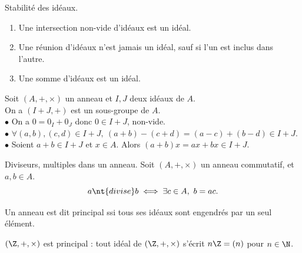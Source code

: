\documentclass[11pt]{article}
\begin{document}
\vspace*{-0.7cm}

\begin{prop}{Stabilité des idéaux.}{}
    \begin{enumerate}
        \item Une intersection non-vide d'idéaux est un idéal.
        \item Une réunion d'idéaux n'est jamais un idéal, sauf si l'un est inclus dans l'autre.
        \item Une somme d'idéaux est un idéal.
    \end{enumerate}
    \tcblower
    Soit $(A,+,\times)$ un anneau et $I,J$ deux idéaux de $A$.\\
     On a $(I+J,+)$ est un sous-groupe de $A$.\\
    $\bullet$ On a $0=0_I+0_J$ donc $0\in I+J$, non-vide.\\
    $\bullet$ $\forall (a,b),(c,d)\in I + J, ~ (a+b)-(c+d)=(a-c)+(b-d)\in I + J$.\\
    $\bullet$ Soient $a+b\in I+J$ et $x\in A$. Alors $(a+b)x=ax+bx\in I + J$.
\end{prop}

\vspace*{-0.7cm}

\begin{defi}{Diviseurs, multiples dans un anneau.}{}
    Soit $(A,+,\times)$ un anneau commutatif, et $a,b\in A$.
    \begin{equation*}
        a \nt{ divise } b \iff \exists c \in A, ~ b = ac.
    \end{equation*}
\end{defi}

\vspace*{-0.7cm}

\begin{defi}{}{}
    Un anneau est dit principal ssi tous ses idéaux sont engendrés par un seul élément.
\end{defi}

\vspace*{-0.7cm}

\begin{ex}{}{}
    $(\Z,+,\times)$ est principal : tout idéal de $(\Z,+,\times)$ s'écrit $n\Z=(n)$ pour $n\in\N$.
\end{ex}
\end{document}
